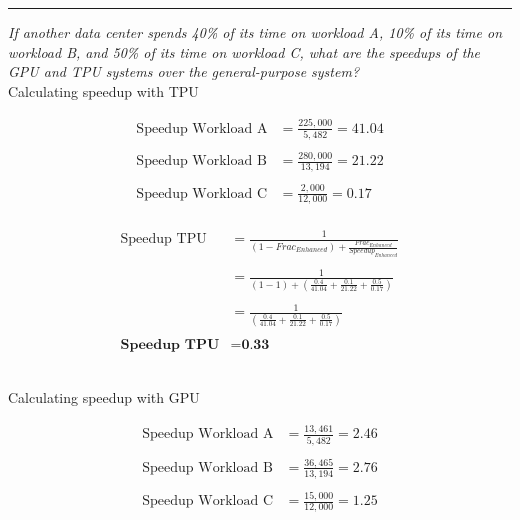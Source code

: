\documentclass[11pt]{exam}
\newcounter{questionCounter}
\newcounter{partCounter}[questionCounter]
\newenvironment{namedquestion}[1]{%
    \addtocounter{questionCounter}{1}%
    \setcounter{partCounter}{0}%
    \vspace{.2in}%
        \noindent{\bf #1}%
    \vspace{0.3em} \hrule \vspace{.1in}%
}{}
\begin{document}
\begin{namedquestion}{Problem 1.6D}
\textit{
 If another data center spends 40\% of its time on workload A, 10\% of its time on workload B, and 50\% of its time on workload C, what are the speedups of the GPU and TPU systems over the general-purpose system?} \\

Calculating speedup with TPU

\begin{equation}
    \begin{split}
        \text{Speedup Workload A} &= \frac{225,000}{5,482} = 41.04\\
        \\
        \text{Speedup Workload B} &= \frac{280,000}{13,194} = 21.22 \\
        \\
        \text{Speedup Workload C} &= \frac{2,000}{12,000} = 0.17 \\
    \end{split}
\end{equation}

\begin{equation}
    \begin{split}
        \text{Speedup TPU} &= \frac{1}{(1 - Frac_{Enhanced}) + \frac{Frac_{Enhanced}}{Speedup_{Enhanced}}}\\
        \\
        &= \frac{1}{(1 - 1) + (\frac{0.4}{41.04} + \frac{0.1}{21.22} + \frac{0.5}{0.17})} \\
        \\
        &= \frac{1}{(\frac{0.4}{41.04} + \frac{0.1}{21.22} + \frac{0.5}{0.17})} \\
        \\
        \textbf{Speedup TPU} &= \textbf{0.33}
    \end{split}
\end{equation}

\\

Calculating speedup with GPU

\begin{equation}
    \begin{split}
        \text{Speedup Workload A} &= \frac{13,461}{5,482} = 2.46\\
        \\
        \text{Speedup Workload B} &= \frac{36,465}{13,194} = 2.76\\
        \\
        \text{Speedup Workload C} &= \frac{15,000}{12,000} = 1.25\\
    \end{split}
\end{equation}


\end{namedquestion}
\end{document}
